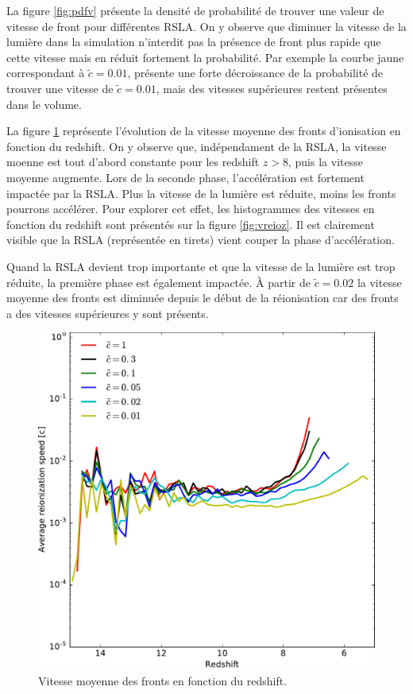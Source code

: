 La figure \ref{fig:pdfv} présente la densité de probabilité de trouver une valeur de vitesse de front pour différentes \ac{RSLA}.
On y observe que diminuer la vitesse de la lumière dans la simulation n'interdit pas la présence de front plus rapide que cette vitesse mais en réduit fortement la probabilité.
Par exemple la courbe jaune correspondant à $\tilde{c}=0.01$, présente une forte décroissance de la probabilité de  trouver une vitesse de  $\tilde{c}=0.01$, mais des vitesses supérieures restent présentes dans le volume.

La figure \ref{fig:vreioz_avg} représente l'évolution de la vitesse moyenne des fronts d'ionisation en fonction du redshift.
On y observe que, indépendament de la \ac{RSLA}, la vitesse moenne est tout d'abord constante pour les redshift $z>8$, puis la vitesse moyenne augmente.
Lors de la seconde phase, l'accélération est fortement impactée par la \ac{RSLA}.
Plus la vitesse de la lumière est réduite, moins les fronts pourrons accélérer.
Pour explorer cet effet, les histogrammes des vitesses en fonction du redshift sont présentés sur la figure \ref{fig:vreioz}.
Il est clairement visible que la \ac{RSLA} (représentée en tirets) vient couper la phase d'accélération.

Quand la \ac{RSLA} devient trop importante et que la vitesse de la lumière est trop réduite, la première phase est également impactée.
À partir de $\tilde{c}=0.02$ la vitesse moyenne des fronts est diminuée depuis le début de la réionisation car des fronts a des vitesses supérieures y sont présents.



\begin{figure}
        \includegraphics[width=.95\linewidth]{img/04_mapreio/avg_reionization_speed.pdf} 
        \caption[Évolution de la vitesse des fronts]{Vitesse moyenne des fronts en fonction du redshift.
        }
 		\label{fig:vreioz_avg}
\end{figure}

